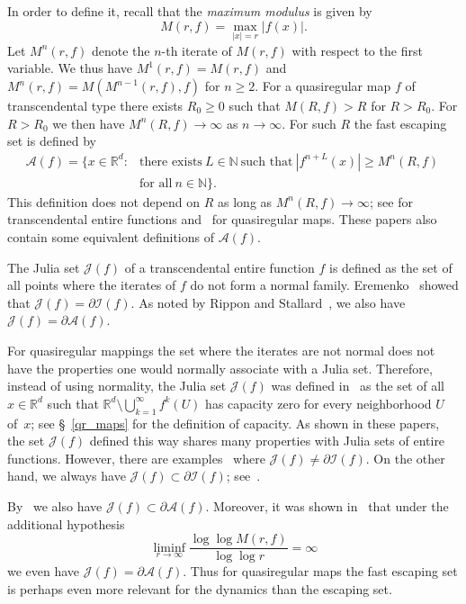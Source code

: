 \documentclass[12pt,a4paper]{amsart}
\theoremstyle{plain}
\theoremstyle{definition}
\theoremstyle{remark}
\def\R{\mathbb R}
\def\N{\mathbb N}
\def\cA{\mathcal A}
\def\cI{\mathcal I}
\def\cJ{\mathcal J}
\numberwithin{equation}{section}
\begin{document}
In order to define it, recall that the \emph{maximum modulus} is given by
\begin{equation} \label{0b}
M(r,f)=\max_{|x|=r}|f(x)|.
\end{equation}
Let $M^n(r,f)$ denote the $n$-th iterate of $M(r,f)$
with respect to the first variable. We thus have 
$M^1(r,f) = M(r,f)$ and $M^n(r,f) = M(M^{n-1}(r,f),f)$ for $n\geq 2$.
For a quasiregular map $f$ of transcendental type
there exists $R_0\geq 0$ such that $M(R,f)>R$ for $R>R_0$.
For $R>R_0$ we then have $M^n(R,f)\to\infty$ as $n\to\infty$.
For such $R$ the fast escaping set is defined by 
\begin{equation} \label{0c}
\begin{aligned}
\cA(f) 
=  \{ x \in \R^d \colon & \text{there exists}\ L \in \N\ \text{such that}\ 
|f^{n+L}(x)| \geq M^n(R,f)\ \\ & \text{for all}\ n\in\N\}.
\end{aligned}
\end{equation}
This definition does not depend on $R$ as long as
$M^n(R,f)\to\infty$; see \cite[Theorem 2.2,~(b)]{Rippon2012} for transcendental entire functions
and~\cite[Proposition 3.1,~(i)]{BDF} for quasiregular maps. These papers also contain some
equivalent definitions of $\cA(f)$.

The Julia set $\cJ(f)$ of a transcendental entire function $f$ is defined as the set of 
all points where the iterates of $f$ do not form a normal family. 
Eremenko~\cite{Eremenko1989} showed that $\cJ(f)=\partial \cI(f)$.
As noted by Rippon and Stallard~\cite[p.~1125, Remark~1]{Rippon2005}, we also have
$\cJ(f)=\partial \cA(f)$.

For quasiregular mappings the set where the iterates are not normal does not
have the properties one would normally associate with a Julia set. 
Therefore, instead of using normality,
the Julia set $\cJ(f)$ was defined in~\cite{Bergweiler2013,BN} as the set of 
all $x\in\R^d$ such that $\R^d\setminus\bigcup_{k=1}^\infty f^k(U)$ has capacity
zero for every neighborhood $U$ of~$x$; see \S~\ref{qr_maps} for the definition of capacity.
As shown in these papers, the set $\cJ(f)$ defined this way shares many properties with Julia sets of entire
functions. However, there are examples~\cite[Example~7.3]{BN} where $\cJ(f)\neq \partial \cI(f)$.
On the other hand, we always have $\cJ(f)\subset \partial \cI(f)$; see~\cite[Theorem~1.3]{BN}.

By~\cite[Theorem~1.1]{BFN} we also have $\cJ(f)\subset\partial \cA(f)$.
Moreover, it was shown in~\cite[Theorem~1.2]{BFN} that under the additional hypothesis 
\begin{equation}\label{0d}
\liminf_{r\to\infty}\frac{\log\log M(r,f)}{\log \log r}=\infty
\end{equation}
we even have $\cJ(f)=\partial \cA(f)$.
Thus for quasiregular maps the fast escaping set is perhaps even more relevant
for the dynamics than the escaping set.
\end{document}
